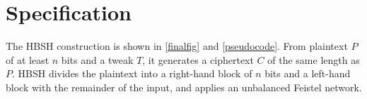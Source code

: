 \documentclass[eprint.tex]{subfiles}
\begin{document}
\section{Specification}
The HBSH construction is shown in \autoref{finalfig} and \autoref{pseudocode}.
From plaintext $P$ of at least $n$ bits and a tweak $T$,
it generates a ciphertext $C$ of the same length as $P$.
HBSH divides the plaintext into a right-hand block of $n$ bits and a left-hand block with
the remainder of the input, and applies an unbalanced Feistel network.

\begin{figure}
    \begin{floatrow}
    \end{floatrow}
\end{figure}
\end{document}
